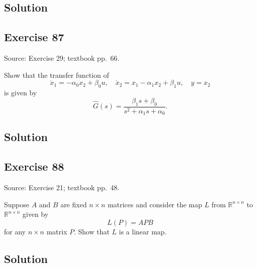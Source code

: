 \documentclass[12pt,a4paper]{article}
\newlength{\questionroom}
\newenvironment{questionprompt}{%
  \begin{lrbox}{\questionbox}\begin{minipage}{\linewidth}%
}{%
  \end{minipage}\end{lrbox}%
  \setlength{\questionroom}{\dimexpr\ht\questionbox+\dp\questionbox+5.2cm\relax}%
  \ifdim\questionroom>\textheight\setlength{\questionroom}{\textheight}\fi
  \Needspace{\questionroom}%
  \noindent\usebox{\questionbox}\par
}
\begin{document}
\subsection*{Solution}
\vspace{3.5cm}


\begin{questionprompt}
\section*{Exercise 87}
\label{practice:87}
{\small Source: Exercise 29; textbook pp.~66.}\par
Show that the transfer function of
\[\dot x_1=-\alpha_0x_2+\beta_0u,\quad\dot x_2=x_1-\alpha_1x_2+\beta_1u,\quad y=x_2\]
is given by
\[\widehat G(s)=\frac{\beta_1s+\beta_0}{s^2+\alpha_1s+\alpha_0}.\]
\end{questionprompt}
\subsection*{Solution}
\vspace{3.5cm}


\begin{questionprompt}
\section*{Exercise 88}
\label{practice:88}
{\small Source: Exercise 21; textbook pp.~48.}\par
Suppose $A$ and $B$ are fixed $n\times n$ matrices and consider the map $L$ from $\mathbb R^{n\times n}$ to $\mathbb R^{n\times n}$ given by
\[L(P)=APB\]
for any $n\times n$ matrix $P$. Show that $L$ is a linear map.
\end{questionprompt}
\subsection*{Solution}
\vspace{3.5cm}
\end{document}
